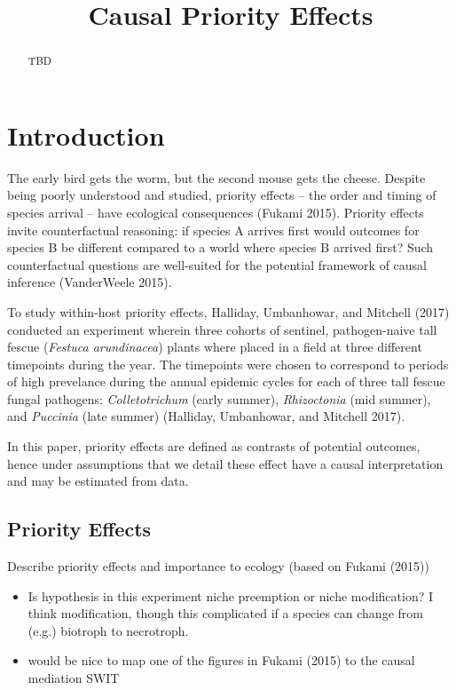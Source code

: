 \documentclass[]{article}
\title{Causal Priority Effects}
\author{}
\date{}
\providecommand{\tightlist}{%
  \setlength{\itemsep}{0pt}\setlength{\parskip}{0pt}}
\begin{document}
\maketitle
\begin{abstract}
TBD
\end{abstract}

\hypertarget{introduction}{%
\section{Introduction}\label{introduction}}

The early bird gets the worm, but the second mouse gets the cheese.
Despite being poorly understood and studied, priority effects -- the
order and timing of species arrival -- have ecological consequences
(Fukami 2015). Priority effects invite counterfactual reasoning: if
species A arrives first would outcomes for species B be different
compared to a world where species B arrived first? Such counterfactual
questions are well-suited for the potential framework of causal
inference (VanderWeele 2015).

To study within-host priority effects, Halliday, Umbanhowar, and
Mitchell (2017) conducted an experiment wherein three cohorts of
sentinel, pathogen-naive tall fescue (\emph{Festuca arundinacea}) plants
where placed in a field at three different timepoints during the year.
The timepoints were chosen to correspond to periods of high prevelance
during the annual epidemic cycles for each of three tall fescue fungal
pathogens: \emph{Colletotrichum} (early summer), \emph{Rhizoctonia} (mid
summer), and \emph{Puccinia} (late summer) (Halliday, Umbanhowar, and
Mitchell 2017).

In this paper, priority effects are defined as contrasts of potential
outcomes, hence under assumptions that we detail these effect have a
causal interpretation and may be estimated from data.

\hypertarget{priority-effects}{%
\subsection{Priority Effects}\label{priority-effects}}

Describe priority effects and importance to ecology (based on Fukami
(2015))

\begin{itemize}
\tightlist
\item
  Is hypothesis in this experiment niche preemption or niche
  modification? I think modification, though this complicated if a
  species can change from (e.g.) biotroph to necrotroph.
\item
  would be nice to map one of the figures in Fukami (2015) to the causal
  mediation SWIT
\end{itemize}
\end{document}
